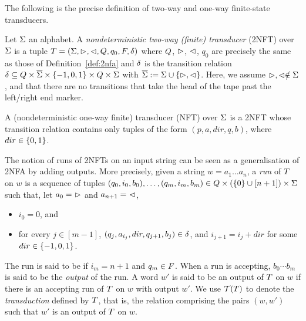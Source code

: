 The following is the precise definition
of two-way and one-way finite-state transducers.
\begin{definition}
    Let $\Sigma$ an alphabet.
    A \emph{nondeterministic two-way (finite) \emph{transducer}} (2NFT) over 
    $\Sigma$ is a tuple $T = (\Sigma, \vartriangleright, \vartriangleleft, Q, q_0, F, \delta)$ where  $Q$, $\vartriangleright$, $\vartriangleleft$, $q_0$ are precisely the same as those of Definition~\ref{def:2nfa}
%
and 
    $\delta$ is the
transition relation  $\delta\subseteq Q \times 
    \overline{\Sigma}\times \{-1, 0, 1\}\times 
    Q \times \Sigma$ with
    $\overline{\Sigma} := \Sigma \cup \{\vartriangleright,\vartriangleleft\}$.
    Here, we assume $\vartriangleright, \vartriangleleft \notin \Sigma$, and that
    there are no transitions that take the head of the tape past the left/right
    end marker. 

    A (nondeterministic one-way finite) transducer (NFT) over
    $\Sigma$
    is a 2NFT whose transition relation contains only tuples of the form
    $(p,a,dir,q,b)$, where $dir \in \{0,1\}$.
\end{definition}



The notion of runs of 2NFTs on an input string can be seen as a generalisation 
of 2NFA by adding outputs. More precisely, given a string $w = a_1 \dots a_n$, a \emph{run} of $T$ on $w$
is a
sequence of tuples $(q_0, i_0, b_0),\ldots, (q_m, i_m, b_m) \in Q \times (\{0\} \cup [n+1]) \times \Sigma$ 
such that, let $a_0 =\ \EndLeft$ and $a_{n+1} =\ \EndRight$, %
\begin{itemize}
    \item $i_0 = 0$, and
    \item for every $j \in [m-1]$, $(q_j, a_{i_j}, dir, q_{j+1}, b_j) \in
        \delta$, and $i_{j+1} = i_j + dir$ for some $dir \in \{-1, 0, 1\}$.
\end{itemize}
The run is said to be  if $i_m = n+1$ and $q_m \in F$. When a run is accepting, $b_0 \cdots b_m$ is said to be the \emph{output} of the run.
A word $w'$ is said to be an output of $T$ on $w$ if there is an accepting run of
$T$ on $w$ with output $w'$. We use $\mathcal{T}(T)$ to denote the \emph{transduction} defined by $T$, that is, the relation comprising the pairs $(w,w')$ such that $w'$ is an output of $T$ on $w$.

